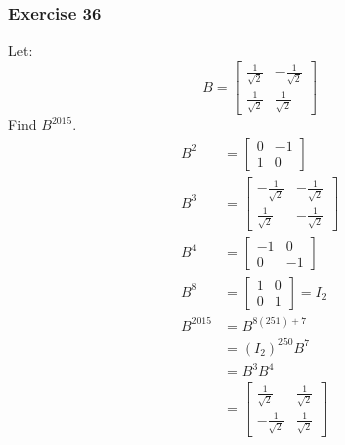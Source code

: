 \documentclass[letterpaper, 12pt]{math}
\begin{document}
\subsubsection*{Exercise 36}
Let:
\[ B = \begin{bmatrix}
  \frac{1}{\sqrt{2}} & -\frac{1}{\sqrt{2}} \\
  \frac{1}{\sqrt{2}} & \frac{1}{\sqrt{2}}
\end{bmatrix} \]
Find \( B^{2015} \).
\begin{align*}
  B^2 &= \begin{bmatrix}0 & -1 \\ 1 & 0\end{bmatrix} \\
  B^3 &= \begin{bmatrix}
    -\frac{1}{\sqrt{2}} & -\frac{1}{\sqrt{2}} \\
    \frac{1}{\sqrt{2}} & -\frac{1}{\sqrt{2}}
  \end{bmatrix} \\
  B^4 &= \begin{bmatrix}
    -1 & 0 \\
    0 & -1
  \end{bmatrix} \\
  B^8 &= \begin{bmatrix}
    1 & 0 \\
    0 & 1
  \end{bmatrix} = I_2 \\
  B^{2015} &= B^{8(251)+7} \\
  &= (I_2)^{250}B^7 \\
  &= B^3B^4 \\
  &= \begin{bmatrix}
    \frac{1}{\sqrt{2}} & \frac{1}{\sqrt{2}} \\
    -\frac{1}{\sqrt{2}} & \frac{1}{\sqrt{2}}
  \end{bmatrix}
\end{align*}
\end{document}
